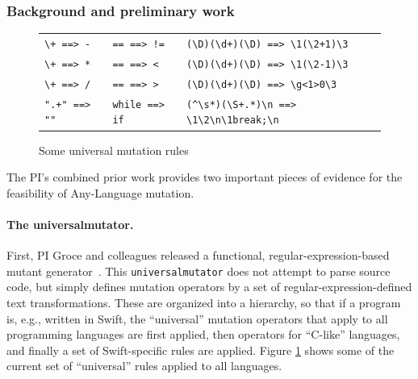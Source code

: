 \subsubsection{Background and preliminary work}


\begin{figure}
\begin{tabularx}{0.75\textwidth}{XXX}
\verb|\+ ==> -| & \verb|== ==> !=| & \verb|(\D)(\d+)(\D) ==> \1(\2+1)\3|\\
\verb|\+ ==> *| & \verb|== ==> <| & \verb|(\D)(\d+)(\D) ==> \1(\2-1)\3|\\
\verb|\+ ==> /| & \verb|== ==> >| & \verb|(\D)(\d+)(\D) ==> \g<1>0\3|\\
\verb|".+" ==> ""| & \verb|while ==> if| & \verb|(^\s*)(\S+.*)\n ==> \1\2\n\1break;\n|\\
\end{tabularx}
\caption{Some universal mutation rules}
\label{fig:rules}
\end{figure}

The PI's combined prior work provides two important pieces of evidence for the
feasibility of Any-Language mutation.

\paragraph{The universalmutator.} First, PI Groce and colleagues
released a functional, regular-expression-based mutant
generator~\cite{regexpMut,universalmutator}.
This {\tt universalmutator}
does not attempt to parse source code, but simply defines mutation
operators by a set of regular-expression-defined text transformations.  These
are organized into a hierarchy, so that if a program is, e.g., written in Swift,
the ``universal'' mutation operators that apply to all programming languages are
first applied, then operators for ``C-like'' languages, and finally a set of
Swift-specific rules are applied.  Figure \ref{fig:rules} shows some of the
current set of ``universal'' rules applied to all languages.

